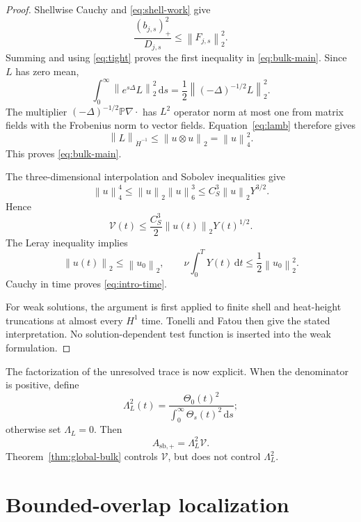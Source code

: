 \documentclass[11pt]{article}
\theoremstyle{definition}
\newcommand{\Pp}{\mathbb P}
\newcommand{\norm}[1]{\left\lVert #1\right\rVert}
\newcommand{\pos}[1]{\left(#1\right)_{+}}
\newcommand{\dd}{\,\mathrm d}
\begin{document}
\begin{proof}
Shellwise Cauchy and \eqref{eq:shell-work} give
\[
 \frac{\pos{b_{j,s}}^2}{D_{j,s}}
 \le\norm{F_{j,s}}_2^2.
\]
Summing and using \eqref{eq:tight} proves the first inequality in
\eqref{eq:bulk-main}.  Since \(L\) has zero mean,
\[
 \int_0^\infty\norm{e^{s\Delta}L}_2^2\dd s
 =\frac12\norm{(-\Delta)^{-1/2}L}_2^2.
\]
The multiplier \((-\Delta)^{-1/2}\Pp\nabla\cdot\) has \(L^2\) operator
norm at most one from matrix fields with the Frobenius norm to vector fields.
Equation~\eqref{eq:lamb} therefore gives
\[
 \norm{L}_{\dot H^{-1}}
 \le\norm{u\otimes u}_2=\norm{u}_4^2.
\]
This proves \eqref{eq:bulk-main}.

The three-dimensional interpolation and Sobolev inequalities give
\[
 \norm{u}_4^4
 \le\norm{u}_2\norm{u}_6^3
 \le C_S^3\norm{u}_2Y^{3/2}.
\]
Hence
\[
 \mathcal V(t)\le\frac{C_S^3}{2}\norm{u(t)}_2Y(t)^{1/2}.
\]
The Leray inequality implies
\[
 \norm{u(t)}_2\le\norm{u_0}_2,
 \qquad
 \nu\int_0^TY(t)\dd t\le\frac12\norm{u_0}_2^2.
\]
Cauchy in time proves \eqref{eq:intro-time}.

For weak solutions, the argument is first applied to finite shell and
heat-height truncations at almost every \(H^1\) time.  Tonelli and Fatou then
give the stated interpretation.  No solution-dependent test function is
inserted into the weak formulation.
\end{proof}

The factorization of the unresolved trace is now explicit.  When the
denominator is positive, define
\begin{equation}\label{eq:Lambda}
 \Lambda_L^2(t)=
 \frac{\Theta_0(t)^2}{\displaystyle\int_0^\infty\Theta_s(t)^2\dd s};
\end{equation}
otherwise set \(\Lambda_L=0\).  Then
\begin{equation}\label{eq:factorization}
 A_{\mathrm{sb},+}=\Lambda_L^2\mathcal V.
\end{equation}
Theorem~\ref{thm:global-bulk} controls \(\mathcal V\), but does not control
\(\Lambda_L^2\).

\section{Bounded-overlap localization}\label{sec:local}
\end{document}
